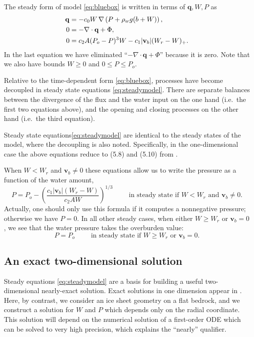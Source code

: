 \documentclass[11pt,final]{amsart}%
\newcommand\bv{\mathbf{v}}
\newcommand\bq{\mathbf{q}}
\newcommand{\Div}{\nabla\cdot}
\newcommand{\grad}{\nabla}
\begin{document}
The steady form of model \eqref{eq:bluebox} is written in terms of $\bq,W,P$ as
\begin{align}
\bq &= - c_0 W\, \grad\left(P + \rho_w g (b+W)\right), \notag \\
0 &= - \Div \bq + \Phi, \label{eq:steadymodel} \\
0 &= c_2 A (P_o - P)^3 W - c_1 |\bv_b| (W_r - W)_+. \notag
\end{align}
In the last equation we have eliminated ``$- \Div \bq + \Phi$'' because it is zero.  Note that we also have bounds $W\ge 0$ and $0 \le P \le P_o$.

Relative to the time-dependent form \eqref{eq:bluebox}, processes have become decoupled in steady state equations \eqref{eq:steadymodel}.  There are separate balances between the divergence of the flux and the water input on the one hand (i.e.~the first two equations above), and the opening and closing processes on the other hand (i.e.~the third equation).

Steady state equations\eqref{eq:steadymodel} are identical to the steady states of the \cite{Schoofetal2012} model, where the decoupling is also noted.  Specifically, in the one-dimensional case the above equations reduce to (5.8) and (5.10) from \cite{Schoofetal2012}.

When $W<W_r$ and $\bv_b \ne 0$ these equations allow us to write the pressure as a function of the water amount,
	$$P = P_o - \left(\frac{c_1 |\bv_b| (W_r - W)}{c_2 A W}\right)^{1/3} \qquad \text{ in steady state if $W<W_r$ and $\bv_b \ne 0$}.$$
Actually, one should only use this formula if it computes a nonnegative pressure; otherwise we have $P=0$.  In all other steady cases, when either $W\ge W_r$ or $\bv_b=0$, we see that the water pressure takes the overburden value:
	$$P = P_o \qquad \text{ in steady state if $W\ge W_r$ or $\bv_b=0$}.$$

\subsection*{An exact two-dimensional solution}  Steady equations \eqref{eq:steadymodel} are a basis for building a useful two-dimensional nearly-exact solution.  Exact solutions in one dimension appear in \cite{Schoofetal2012}.  Here, by contrast, we consider an ice sheet geometry on a flat bedrock, and we construct a solution for $W$ and $P$ which depends only on the radial coordinate.  This solution will depend on the numerical solution of a first-order ODE which can be solved to very high precision, which explains the ``nearly'' qualifier.
\end{document}
